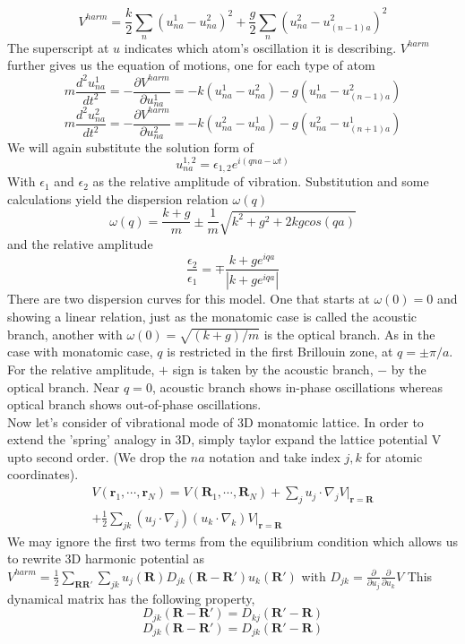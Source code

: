 \documentclass{article}
\begin{document}
$$V^{harm}=\frac{k}{2}\sum_n(u^1_{na}-u^2_{na})^2+\frac{g}{2}\sum_n(u^2_{na}-u^2_{(n-1)a})^2$$
The superscript at $u$ indicates which atom's oscillation it is describing. $V^{harm}$ further gives us the equation of motions, one for each type of atom
$$m\frac{d^2 u^1_{na}}{dt^2}=-\frac{\partial V^{harm}}{\partial u^1_{na}}=-k(u^1_{na}-u^2_{na})-g(u^1_{na}-u^2_{(n-1)a})$$
$$m\frac{d^2 u^2_{na}}{dt^2}=-\frac{\partial V^{harm}}{\partial u^2_{na}}=-k(u^2_{na}-u^1_{na})-g(u^2_{na}-u^1_{(n+1)a})$$
We will again substitute the solution form of
$$u^{1,2}_{na}=\epsilon_{1,2}e^{i(qna-\omega t)}$$
With $\epsilon_1$ and $\epsilon_2$ as the relative amplitude of vibration. Substitution and some calculations yield the dispersion relation $\omega(q)$
$$\omega(q)=\frac{k+g}{m}\pm\frac{1}{m}\sqrt{k^2+g^2+2kgcos(qa)}$$
and the relative amplitude
$$\frac{\epsilon_2}{\epsilon_1}=\mp\frac{k+ge^{iqa}}{|k+ge^{iqa}|}$$
There are two dispersion curves for this model. One that starts at $\omega(0)=0$ and showing a linear relation, just as the monatomic case is called the acoustic branch, another with $\omega(0)=\sqrt{(k+g)/m}$ is the optical branch. As in the case with monatomic case, $q$ is restricted in the first Brillouin zone, at $q=\pm\pi /a$. For the relative amplitude, $+$ sign is taken by the acoustic branch, $-$ by the optical branch. Near $q=0$, acoustic branch shows in-phase oscillations whereas optical branch shows out-of-phase oscillations.\\
Now let's consider of vibrational mode of 3D monatomic lattice. In order to extend the 'spring' analogy in 3D, simply taylor expand the lattice potential V upto second order. (We drop the $na$ notation and take index $j,k$ for atomic coordinates).
\begin{multline*}
	V(\mathbf{r}_1,\cdots,\mathbf{r}_{N})=V(\mathbf{R}_1,\cdots,\mathbf{R}_{N})+\sum_ju_j\cdot\nabla_j V\Biggl |_{\mathbf{r}=\mathbf{R}}\\
	+\frac{1}{2}\sum_{jk}(u_j\cdot\nabla_j)(u_k\cdot\nabla_k)V\Biggl|_{\mathbf{r}=\mathbf{R}}
\end{multline*}
We may ignore the first two terms from the equilibrium condition which allows us to rewrite 3D harmonic potential as
$V^{harm}=\frac{1}{2}\sum_{\mathbf{R}\mathbf{R}'}\sum_{jk}u_j(\mathbf{R})D_{jk}(\mathbf{R}-\mathbf{R}')u_k(\mathbf{R}')$
with $D_{jk}=\frac{\partial}{\partial u_j}\frac{\partial}{\partial u_k}V$
This dynamical matrix has the following property,
$$D_{jk}(\mathbf{R}-\mathbf{R}')=D_{kj}(\mathbf{R}'-\mathbf{R})$$
$$D_{jk}(\mathbf{R}-\mathbf{R}')=D_{jk}(\mathbf{R}'-\mathbf{R})$$
\end{document}
